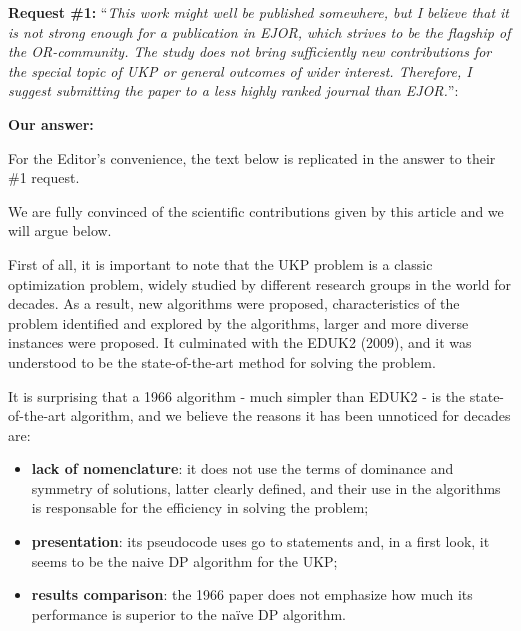 \documentclass{elsarticle}
\begin{document}
\bigskip

\textbf{Request \#1:} ``\textit{This work might well be published somewhere, but I believe that it is not strong enough for a publication in EJOR, which strives to be the flagship of the OR-community. The study does not bring sufficiently new contributions for the special topic of UKP or general outcomes of wider interest. Therefore, I suggest submitting the paper to a less highly ranked journal than EJOR.}'':

\textbf{Our answer:} 

For the Editor's convenience, the text below is replicated in the answer to their \#1 request.

We are fully convinced of the scientific contributions given by this article and we will argue below.

First of all, it is important to note that the UKP problem is a classic optimization problem,
widely studied by different research groups in the world for decades.
As a result, new algorithms were proposed, characteristics of the problem identified and explored by the algorithms, larger and more diverse instances were proposed.
It culminated with the EDUK2 (2009), and it was understood to be the state-of-the-art method for solving the problem.

It is surprising that a 1966 algorithm - much simpler than EDUK2 - is the state-of-the-art algorithm, and we believe the reasons it has been unnoticed for decades are:

\begin{itemize}

\item \textbf{lack of nomenclature}: it does not use the terms of dominance and symmetry of solutions, latter clearly defined, and their use in the algorithms is responsable for the efficiency in solving the problem;

\item \textbf{presentation}: its pseudocode uses go to statements and, in a first look, it seems to be the naive DP algorithm for the UKP;

\item \textbf{results comparison}: the 1966 paper does not emphasize how much its performance is superior to the naïve DP algorithm.

\end{itemize}
\end{document}
